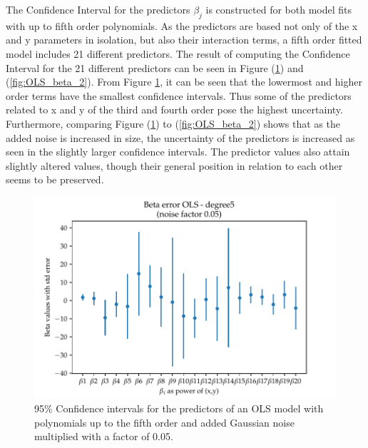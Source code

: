 \documentclass[11pt, a4paper]{article}
\begin{document}
The Confidence Interval for the predictors $\beta_j$ is constructed for both model fits with up to fifth order polynomials. As the predictors are based not only of the x and y parameters in isolation, but also their interaction terms, a fifth order fitted model includes 21 different predictors. The result of computing the Confidence Interval for the 21 different predictors can be seen in Figure (\ref{fig:OLS_beta_1}) and (\ref{fig:OLS_beta_2}). From Figure \ref{fig:OLS_beta_1}, it can be seen that the lowermost and higher order terms have the smallest confidence intervals. Thus some of the predictors related to x and y of the third and fourth order pose the highest uncertainty. Furthermore, comparing Figure (\ref{fig:OLS_beta_1}) to (\ref{fig:OLS_beta_2}) shows that as the added noise is increased in size, the uncertainty of the predictors is increased as seen in the slightly larger confidence intervals. The predictor values also attain slightly altered values, though their general position in relation to each other seems to be preserved.

\begin{figure}
  \centering
  \includegraphics[scale=.85]{figures/EX1_OLS_beta_error_degree5.pdf}
  \caption{\label{fig:OLS_beta_1} 95\% Confidence intervals for the predictors of an OLS model with polynomials up to the fifth order and added Gaussian noise multiplied with a factor of 0.05.}
\end{figure}
\end{document}
